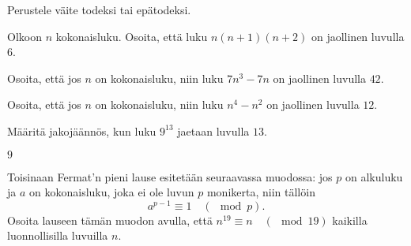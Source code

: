 \begin{tehtavasivu}
\begin{tehtava}
\end{tehtava}

\begin{tehtava}
    Perustele väite todeksi tai epätodeksi.
    
    
    \begin{vastaus}
    
    \end{vastaus}
    
\end{tehtava}

\begin{tehtava}
    Olkoon $n$ kokonaisluku. Osoita, että luku $n(n+1)(n+2)$ on jaollinen luvulla $6$.
\end{tehtava}

\begin{tehtava}
    Osoita, että jos $n$ on kokonaisluku, niin luku $7n^3 - 7n$ on jaollinen luvulla $42$.
\end{tehtava}

\begin{tehtava}
    Osoita, että jos $n$ on kokonaisluku, niin luku $n^4 - n^2$ on jaollinen luvulla $12$.
\end{tehtava}

\begin{tehtava}
    Määritä jakojäännös, kun luku $9^{13}$ jaetaan luvulla $13$.
    
    \begin{vastaus}
        $9$
    \end{vastaus}
    
\end{tehtava}

\begin{tehtava}
    Toisinaan Fermat'n pieni lause esitetään seuraavassa
    muodossa:
    jos $p$ on alkuluku ja $a$ on kokonaisluku, joka ei ole
    luvun $p$ monikerta, niin tällöin
    \[
    a^{p-1}\equiv 1\quad (\mod p).
    \]
    Osoita lauseen tämän muodon avulla, että $n^{19}\equiv n \quad
    (\mod 19)$ kaikilla luonnollisilla luvuilla $n$.
\end{tehtava}


\end{tehtavasivu}
